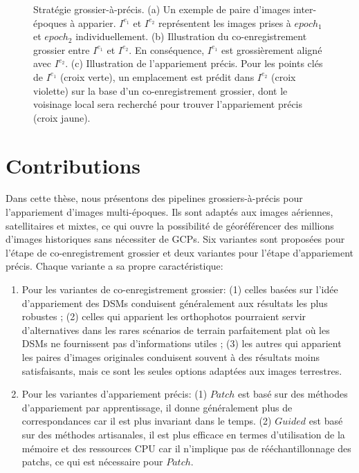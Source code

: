 \begin{figure}[htbp]
\begin{center}
{		}
		\caption{Stratégie grossier-à-précis. (a) Un exemple de paire d'images inter-époques à apparier. $I^{e_1}$ et $I^{e_2}$ représentent les images prises à $epoch_1$ et $epoch_2$ individuellement. (b) Illustration du co-enregistrement grossier entre $I^{e_1}$ et $I^{e_2}$. En conséquence, $I^{e_1}$ est grossièrement aligné avec $I^{e_2}$. (c) Illustration de l'appariement précis. Pour les points clés de $I^{e_1}$ (croix verte), un emplacement est prédit dans $I^{e_2}$ (croix violette) sur la base d'un co-enregistrement grossier, dont le voisinage local sera recherché pour trouver l'appariement précis (croix jaune).}
		\label{grossier-à-précis}
	\end{center}
\end{figure}

\section{Contributions}
Dans cette thèse, nous présentons des pipelines grossiers-à-précis pour l'appariement d'images multi-époques. Ils sont adaptés aux images aériennes, satellitaires et mixtes, ce qui ouvre la possibilité de géoréférencer des millions d'images historiques sans nécessiter de \ac{GCP}s. 
Six variantes sont proposées pour l'étape de co-enregistrement grossier et deux variantes pour l'étape d'appariement précis. Chaque variante a sa propre caractéristique:\\
\begin{enumerate}
	\item Pour les variantes de co-enregistrement grossier: (1) celles basées sur l'idée d'appariement des \ac{DSM}s conduisent généralement aux résultats les plus robustes ; (2) celles qui apparient les orthophotos pourraient servir d'alternatives dans les rares scénarios de terrain parfaitement plat où les \ac{DSM}s ne fournissent pas d'informations utiles ; (3) les autres qui apparient les paires d'images originales conduisent souvent à des résultats moins satisfaisants, mais ce sont les seules options adaptées aux images terrestres.
	\item Pour les variantes d'appariement précis: (1) $Patch$ est basé sur des méthodes d'appariement par apprentissage, il donne généralement plus de correspondances car il est plus invariant dans le temps. (2) $Guided$ est basé sur des méthodes artisanales, il est plus efficace en termes d'utilisation de la mémoire et des ressources CPU car il n'implique pas de rééchantillonnage des patchs, ce qui est nécessaire pour $Patch$. 
\end{enumerate}
